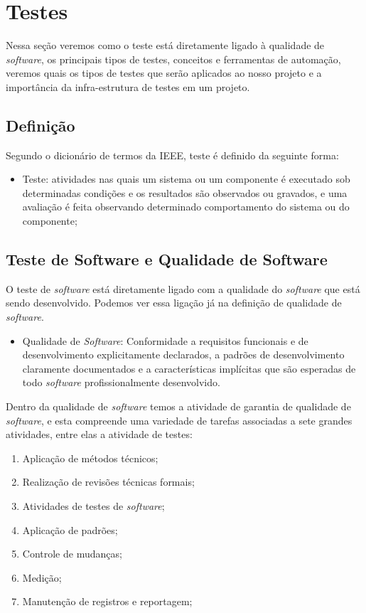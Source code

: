 \section{Testes}

Nessa seção veremos como o teste está diretamente ligado à qualidade de \textit{software}, os principais tipos de testes, conceitos e ferramentas de automação, veremos quais os tipos de testes que serão aplicados ao nosso projeto e a importância da infra-estrutura de testes em um projeto.


\subsection{Definição}

Segundo o dicionário de termos da IEEE, teste é definido da seguinte forma:

\begin{itemize}
	\item Teste: atividades nas quais um sistema ou um componente é executado sob determinadas condições e os resultados são observados ou gravados, e uma avaliação é feita observando determinado comportamento do sistema ou do componente;
\end{itemize}

\subsection{Teste de Software e Qualidade de Software}

O teste de \textit{software} está diretamente ligado com a qualidade do \textit{software} que está sendo desenvolvido. Podemos ver essa ligação já na definição de qualidade de \textit{software}.

\begin{itemize}
	\item Qualidade de \textit{Software}: Conformidade a requisitos funcionais e de desenvolvimento explicitamente declarados, a padrões de desenvolvimento claramente documentados e a características implícitas que são esperadas de todo \textit{software} profissionalmente desenvolvido.
\end {itemize}

Dentro da qualidade de \textit{software} temos a atividade de garantia de qualidade de \textit{software}, e esta compreende uma variedade de tarefas associadas a sete grandes atividades, entre elas a atividade de testes:

\begin{enumerate}
	\item Aplicação de métodos técnicos;
	\item Realização de revisões técnicas formais;
	\item Atividades de testes de \textit{software};
	\item Aplicação de padrões;
	\item Controle de mudanças;
	\item Medição;
	\item Manutenção de registros e reportagem;
\end{enumerate}


